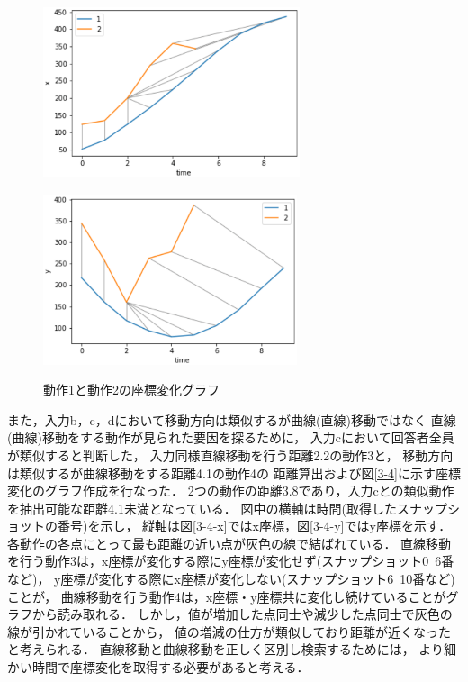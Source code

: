 \documentclass[11pt]{jreport}
\begin{document}
\begin{figure}[H]
    \centering
    \begin{minipage}{0.45\linewidth}
        \centering
        \includegraphics[height=5cm]{1-2-x.eps}
        \label{1-2-x}
    \end{minipage}
    \hspace{0.04\columnwidth}
    \begin{minipage}{0.45\linewidth}
        \centering
        \includegraphics[height=5cm]{1-2-y.eps}
        \label{1-2-y}
    \end{minipage}
    \hspace{0.04\columnwidth}
    \caption{動作1と動作2の座標変化グラフ}
    \label{1-2}
\end{figure}

また，入力b，c，dにおいて移動方向は類似するが曲線(直線)移動ではなく
直線(曲線)移動をする動作が見られた要因を探るために，
入力cにおいて回答者全員が類似すると判断した，
入力同様直線移動を行う距離2.2の動作3と，
移動方向は類似するが曲線移動をする距離4.1の動作4の
距離算出および図\ref{3-4}に示す座標変化のグラフ作成を行なった．
2つの動作の距離3.8であり，入力cとの類似動作を抽出可能な距離4.1未満となっている．
図中の横軸は時間(取得したスナップショットの番号)を示し，
縦軸は図\ref{3-4-x}ではx座標，図\ref{3-4-y}ではy座標を示す．
各動作の各点にとって最も距離の近い点が灰色の線で結ばれている．
直線移動を行う動作3は，x座標が変化する際にy座標が変化せず(スナップショット0~6番など)，
y座標が変化する際にx座標が変化しない(スナップショット6~10番など)ことが，
曲線移動を行う動作4は，x座標・y座標共に変化し続けていることがグラフから読み取れる．
しかし，値が増加した点同士や減少した点同士で灰色の線が引かれていることから，
値の増減の仕方が類似しており距離が近くなったと考えられる．
直線移動と曲線移動を正しく区別し検索するためには，
より細かい時間で座標変化を取得する必要があると考える．
\end{document}
